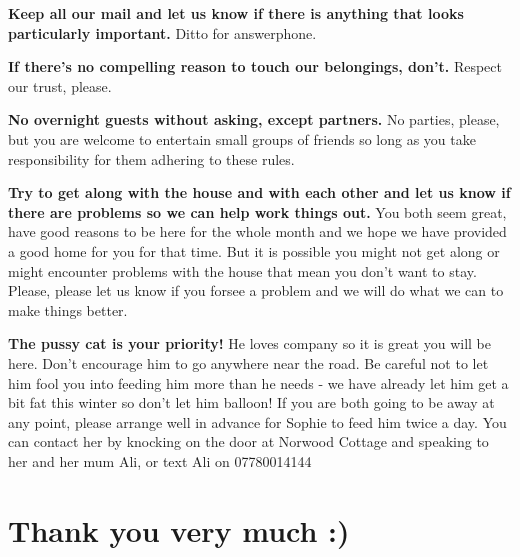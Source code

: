\documentclass[11pt]{article}
\begin{document}
\textbf{Keep all our mail and let us know if there is anything that looks particularly important.}  Ditto for answerphone.  

\textbf{If there's no compelling reason to touch our belongings, don't.}  Respect our trust, please.   

\textbf{No overnight guests without asking, except partners.}  No parties, please, but you are welcome to entertain small groups of friends so long as you take responsibility for them adhering to these rules. 

\textbf{Try to get along with the house and with each other and let us know if there are problems so we can help work things out.}  You both seem great, have good reasons to be here for the whole month and we hope we have provided a good home for you for that time.  But it is possible you might not get along or might encounter problems with the house that mean you don't want to stay.  Please, please let us know if you forsee a problem and we will do what we can to make things better.  

\textbf{The pussy cat is your priority!}  He loves company so it is great you will be here.  Don't encourage him to go anywhere near the road.  Be careful not to let him fool you into feeding him more than he needs - we have already let him get a bit fat this winter so don't let him balloon!  If you are both going to be away at any point, please arrange well in advance for Sophie to feed him twice a day.  You can contact her by knocking on the door at Norwood Cottage and speaking to her and her mum Ali, or text Ali on 07780014144

\section{Thank you very much :)} 
\end{document}
